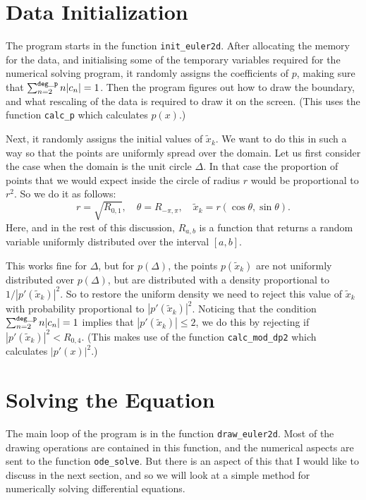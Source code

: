 \documentclass[12pt]{article}
\begin{document}
\section{Data Initialization}

The program starts in the function {\tt init\_euler2d}.  After allocating
the memory for the data, and initialising some of the temporary variables
required for the numerical solving program, it randomly assigns the
coefficients of $p$, making sure that $\sum_{n=2}^{\tt deg\_p} n |c_n| = 1$.
Then the program figures out how to draw the boundary, and what rescaling
of the data is required to draw it on the screen.  (This uses the
function {\tt calc\_p} which calculates $p(x)$.)

Next, it randomly assigns the initial values of $\tilde x_k$.  We want
to do this in such a way so that the points are uniformly spread over the
domain.  Let us first consider the case when the domain is the unit circle
$\Delta$.  In that case the proportion of points that we would expect
inside the circle of radius $r$ would be proportional to $r^2$.  So
we do it as follows:
\[ r = \sqrt{R_{0,1}},\quad \theta = R_{-\pi,\pi}, \quad
   \tilde x_k = r (\cos \theta, \sin \theta) .\]
Here, and in the rest of this discussion, $R_{a,b}$ is a function
that returns a random variable uniformly distributed over the interval
$[a,b]$.

This works fine for $\Delta$, but for $p(\Delta)$, the points
$p(\tilde x_k)$ are not uniformly distributed over $p(\Delta)$,
but are distributed with a density proportional to
$1/|p'(\tilde x_k)|^2$.  So to restore the uniform density we need
to reject this value of $\tilde x_k$ with probability proportional
to $|p'(\tilde x_k)|^2$.  Noticing that the condition
$\sum_{n=2}^{\tt deg\_p} n |c_n| = 1$ implies that
$|p'(\tilde x_k)| \le 2$, we
do this by rejecting if $|p'(\tilde x_k)|^2 < R_{0,4}$.
(This makes use of the function {\tt calc\_mod\_dp2} which calculates
$|p'(x)|^2$.)

\section{Solving the Equation}

The main loop of the program is in the function {\tt draw\_euler2d}.
Most of the drawing operations are contained in this function, and
the numerical aspects are sent to the function {\tt ode\_solve}.
But there is an aspect of this that I would like
to discuss in the next section, and so we will look at a simple method for
numerically solving differential equations.
\end{document}
